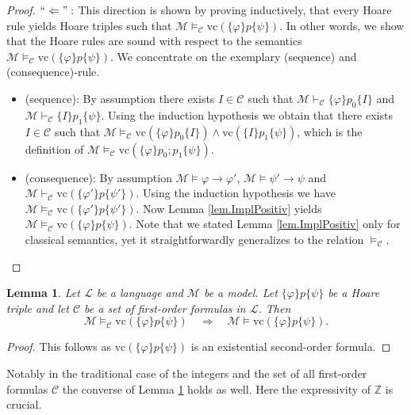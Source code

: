 \documentclass[acmsmall]{acmart}
\theoremstyle{plain}
\newtheorem{lemma}[theorem]{Lemma}
\theoremstyle{definition}
\newcommand{\calL}{\mathcal{L}}
\newcommand{\calM}{\mathcal{M}}
\newcommand{\calC}{\mathcal{C}}
\newcommand{\Int}{\mathbb{Z}}
\newcommand{\impl}{\rightarrow} %
\newcommand{\proves}{\vdash}
\newcommand{\hoare}[3]{\{#1\}#2\{#3\}}
\newcommand{\vc}{\mathrm{vc}}
\begin{document}
\begin{proof}
	$``\Leftarrow":$ This direction is shown by proving inductively, that every Hoare rule yields Hoare triples such that $\calM \models_{\calC} \vc(\hoare{\varphi}{p}{\psi})$. In other words, we show that the Hoare rules are sound with respect to the semantics $\calM \models_{\calC} \vc(\hoare{\varphi}{p}{\psi})$. We concentrate on the exemplary (sequence) and (consequence)-rule.
	\begin{itemize}
		\item (sequence): By assumption there exists $I \in \calC$ such that $\calM \vdash_{\calC} \hoare{\varphi}{p_0}{I}$ and $\calM \vdash_{\calC} \hoare{I}{p_1}{\psi}$. Using the induction hypothesis we obtain that there exists $I \in \calC$ such that $\calM \models_{\calC} \vc(\hoare{\varphi}{p_0}{I}) \wedge \vc(\hoare{I}{p_1}{\psi})$, which is the definition of $\calM \models_{\calC} \vc(\hoare{\varphi}{p_0;p_1}{\psi})$.
		\item (consequence): By assumption $\calM \models \varphi \impl \varphi'$, $\calM \models \psi' \impl \psi$ and $\calM \proves_{\calC} \vc(\hoare{\varphi'}{p}{\psi'})$. Using the induction hypothesis we have $\calM \models_{\calC} \vc(\hoare{\varphi'}{p}{\psi'})$. Now Lemma \ref{lem.ImplPositiv} yields $\calM \models_{\calC} \vc(\hoare{\varphi}{p}{\psi})$. Note that we stated Lemma \ref{lem.ImplPositiv} only for classical semantics, yet it straightforwardly generalizes to the relation $\models_{\calC}$.
	\end{itemize}
\end{proof}


\begin{lemma}\label{lem.abstractVc}
	Let $\calL$ be a language and $\calM$ be a model. Let $\hoare{\varphi}{p}{\psi}$ be a Hoare triple and let $\calC$ be a set of first-order formulas in $\calL$. Then
	\[
	\calM \models_{\calC} \vc(\hoare{\varphi}{p}{\psi}) \quad \Rightarrow \quad \calM \models \vc(\hoare{\varphi}{p}{\psi}).
	\]
\end{lemma}
\begin{proof}
	This follows as $\vc(\hoare{\varphi}{p}{\psi})$ is an existential second-order formula.
\end{proof}

Notably in the traditional case of the integers and the set of all first-order formulas $\calC$ the converse of Lemma \ref{lem.abstractVc} holds as well. Here the expressivity of $\Int$ is crucial.
\end{document}
